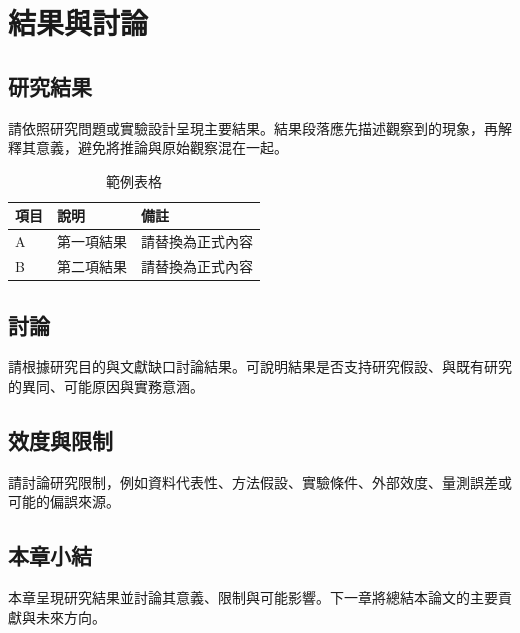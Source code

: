 \chapter{結果與討論}

\section{研究結果}

請依照研究問題或實驗設計呈現主要結果。結果段落應先描述觀察到的現象，再解釋其意義，避免將推論與原始觀察混在一起。

\begin{table}[htbp]
  \centering
  \caption{範例表格}
  \label{tab:example}
  \begin{tabular}{lll}
    \toprule
    項目 & 說明 & 備註 \\
    \midrule
    A & 第一項結果 & 請替換為正式內容 \\
    B & 第二項結果 & 請替換為正式內容 \\
    \bottomrule
  \end{tabular}
\end{table}

\section{討論}

請根據研究目的與文獻缺口討論結果。可說明結果是否支持研究假設、與既有研究的異同、可能原因與實務意涵。

\section{效度與限制}

請討論研究限制，例如資料代表性、方法假設、實驗條件、外部效度、量測誤差或可能的偏誤來源。

\section{本章小結}

本章呈現研究結果並討論其意義、限制與可能影響。下一章將總結本論文的主要貢獻與未來方向。
